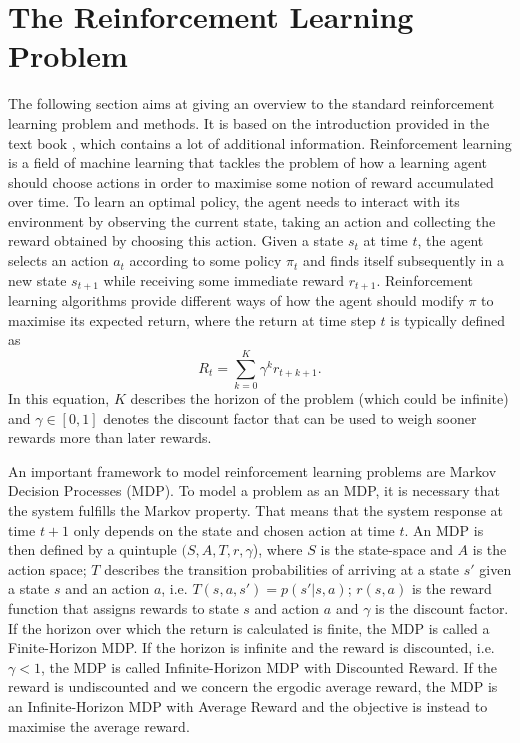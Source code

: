 \documentclass[../main.tex]{subfiles}
\begin{document}
\section{The Reinforcement Learning Problem}\label{sec:RL}
The following section aims at giving an overview to the standard reinforcement learning problem and methods. It is based on the introduction provided in the text book \cite{sutton1998reinforcement}, which contains a lot of additional information.
Reinforcement learning is a field of machine learning that tackles the problem of how a learning agent should choose actions in order to maximise some notion of reward accumulated over time. To learn an optimal policy, the agent needs to interact with its environment by observing the current state, taking an action and collecting the reward obtained by choosing this action. Given a state $s_t$ at time $t$, the agent selects an action $a_t$ according to some policy $\pi_t$ and finds itself subsequently in a new state $s_{t+1}$ while receiving some immediate reward $r_{t+1}$. Reinforcement learning algorithms provide different ways of how the agent should modify $\pi$ to maximise its expected return, where the return at time step $t$ is typically defined as
\begin{equation}
R_t = \sum_{k=0}^K \gamma^kr_{t+k+1}.
\end{equation}
In this equation, $K$ describes the horizon of the problem (which could be infinite) and $\gamma \in [0,1]$ denotes the discount factor that can be used to weigh sooner rewards more than later rewards.\par
An important framework to model reinforcement learning problems are Markov Decision Processes (MDP). To model a problem as an MDP, it is necessary that the system fulfills the Markov property. That means that the system response at time $t+1$ only depends on the state and chosen action at time $t$. An MDP is then defined by a quintuple $(S,A,T,r,\gamma$), where $S$ is the state-space and $A$ is the action space; $T$ describes the transition probabilities of arriving at a state $s'$ given a state $s$ and an action $a$, i.e. $T(s,a,s') = p(s'|s,a)$; $r(s,a)$ is the reward function that assigns rewards to state $s$ and action $a$ and $\gamma$ is the discount factor. If the horizon over which the return is calculated is finite, the MDP is called a Finite-Horizon MDP. If the horizon is infinite and the reward is discounted, i.e. $\gamma<1$, the MDP is called Infinite-Horizon MDP with Discounted Reward. If the reward is undiscounted and we concern the ergodic average reward, the MDP is an Infinite-Horizon MDP with Average Reward and the objective is instead to maximise the average reward.\par
\end{document}
